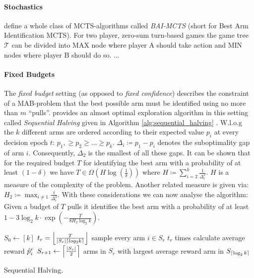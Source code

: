 \paragraph{Stochastics}
\cite{kaufmann2017monte} define a whole class of MCTS-algorithms called \textit{BAI-MCTS} (short for Best Arm Identification MCTS). For two player, zero-sum turn-based games the game tree $\mathcal{T}$ can be divided into MAX node where player A should take action and MIN nodes where player B should do so. ...
\paragraph{Fixed Budgets}
The \textit{fixed budget} setting (as opposed to \textit{fixed confidence}) describes the constraint of a MAB-problem that the best possible arm must be identified using no more than $m$ \enquote{pulls}.
\cite{karnin2013almost} provides an almost optimal exploration algorithm in this setting called \textit{Sequential Halving} given in Algorithm \ref{alg:sequential_halving} . W.l.o.g the $k$ different arms are ordered according to their expected value $p_i$ at every decision epoch $t$: $p_1, \geq p_2 \geq \ldots \geq p_k$. $\Delta_i \coloneqq p_1 - p_i$ denotes the suboptimality gap of arm $i$. Consequently, $\Delta_2$ is the smallest of all these gaps. It can be shown that for the required budget $T$ for identifying the best arm with a probability of at least $(1-\delta)$ we have $T \in \Omega(H \log (\frac{1}{\delta}))$ where $H \coloneqq \sum_{i=2}^{k} \frac{1}{\Delta_i^2}$. $H$ is a measure of the complexity of the problem. Another related measure is given via: $H_2 \coloneqq \max_{i \neq 1} \frac{i}{\Delta_i^2}$. With these considerations we can now analyse the algorithm: Given a budget of $T$ pulls it identifies the best arm with a probability of at least $1-3 \log_2 k \cdot \exp \left(-\frac{T}{8H_2 \log_2 k}\right)$. 

\begin{algorithm}[htbp]
\begin{algorithmic}
    \State $S_0 \gets [k]$
    \State $t_r = \floor*{\frac{T}{\left|S_r\right| \ceil*{log_2 k}}}$
    \State sample every arm $i \in S_r$ $t_r$ times
    \State calculate average reward $\Hat{p}_i^r$
    \State $S_{r+1} \gets \ceil*{\frac{\left| S_r \right|}{2}}$ arms in $S_r$ with largest average reward
    \EndFor
    \State \Return arm in $S_{\ceil*{\log_2 k}}$
\EndFunction
\end{algorithmic}
\caption{Sequential Halving.}
\label{alg:sequential_halving}
\end{algorithm}

